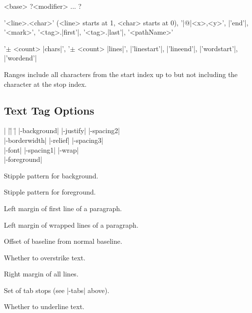 \begin{enum}{2cm}

 <base> ?<modifier> ... ?

 '<line>.<char>' (<line> starts at 1, <char> starts at 0), '|@|<x>,<y>', |'end'|, '<mark>', 
	   '<tag>.|first'|, '<tag>.|last'|, '<pathName>'

 '$\pm$ <count> |chars|', '$\pm$ <count> |lines|', |'linestart'|,
	       |'lineend'|, |'wordstart'|, |'wordend'|

 Ranges include all characters from the start index up to
but not including the character at the stop index.

\end{enum}
 
\subsection*{Text Tag Options}
\begin{tabbing}
|                    |\=|                    |\= \kill
|-background|         \> |-justify|         \> |-spacing2| \\
|-borderwidth|        \> |-relief|          \> |-spacing3| \\
|-font|               \> |-spacing1|        \> |-wrap| \\
|-foreground|      
\end{tabbing}

\vskip5pt
\begin{enum}{4.5cm}

 Stipple pattern for background.

 Stipple pattern for foreground.

 Left margin of first line of a paragraph.  

 Left margin of wrapped lines of a paragraph. 

 Offset of baseline from normal baseline. 

 Whether to overstrike text.

 Right margin of all lines. 

 Set of tab stops (see |-tabs| above).

 Whether to underline text. 

\end{enum}

